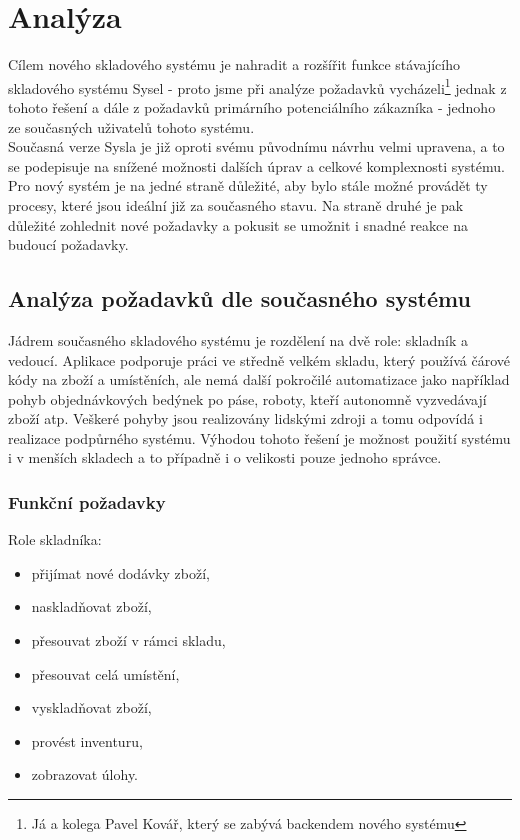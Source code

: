 \chapter{Analýza}

Cílem nového skladového systému je nahradit a rozšířit funkce stávajícího skladového systému Sysel - proto jsme při analýze požadavků vycházeli\footnote{Já a kolega Pavel Kovář, který se zabývá backendem nového systému} jednak z tohoto řešení a dále z požadavků primárního potenciálního zákazníka - jednoho ze současných uživatelů tohoto systému.\\
Současná verze Sysla je již oproti svému původnímu návrhu velmi upravena, a to se podepisuje na snížené možnosti dalších úprav a celkové komplexnosti systému.\\
Pro nový systém je na jedné straně důležité, aby bylo stále možné provádět ty procesy, které jsou ideální již za současného stavu. Na straně druhé je pak důležité zohlednit nové požadavky a pokusit se umožnit i snadné reakce na budoucí požadavky.


\section{Analýza požadavků dle současného systému}\label{sec:analysis}

Jádrem současného skladového systému je rozdělení na dvě role: skladník a vedoucí. Aplikace podporuje práci ve středně velkém skladu, který používá čárové kódy na zboží a umístěních, ale nemá další pokročilé automatizace jako například pohyb objednávkových bedýnek po páse, roboty, kteří autonomně vyzvedávají zboží atp. Veškeré pohyby jsou realizovány lidskými zdroji a tomu odpovídá i realizace podpůrného systému. Výhodou tohoto řešení je možnost použití systému i v menších skladech a to případně i o velikosti pouze jednoho správce.\\

\subsection{Funkční požadavky}

Role skladníka:
\begin{itemize}
	\item přijímat nové dodávky zboží,
	\item naskladňovat zboží,
	\item přesouvat zboží v rámci skladu,
	\item přesouvat celá umístění,
	\item vyskladňovat zboží,
	\item provést inventuru,
	\item zobrazovat úlohy.
\end{itemize}


